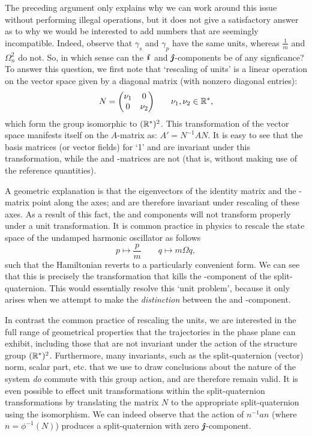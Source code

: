 The preceding argument only explains why we can work around this issue without performing illegal operations, but it does not give a satisfactory answer as to why we would be interested to add numbers that are seemingly incompatible. Indeed, observe that \(\gamma_s\) and \(\gamma_p\) have the same units, whereas \(\tfrac{1}{m}\) and \(\Omega_n^2\) do not. So, in which sense can the \(\quati\) and \(\quatj\)-components be of any signficance? To answer this question, we first note that `rescaling of units' is a linear operation on the vector space given by a diagonal matrix (with nonzero diagonal entries): 
\begin{equation}
     N = \mqty(\dmat[0]{\nu_1}{\nu_2}) \qquad \nu_1, \nu_2 \in \real^*,
\end{equation}
which form the group isomorphic to \((\real^*)^2\). This transformation of the vector space manifests itself on the \(A\)-matrix as: \( A' = N^{-1}A N\). It is easy to see that the basis matrices (or vector fields) for `1' and \quatk are invariant under this transformation, while the \quati and \quatj-matrices are not (that is, without making use of the reference quantities). 

A geometric explanation is that the eigenvectors of the identity matrix and the \quatk-matrix point along the axes; and are therefore invariant under rescaling of these axes. As a result of this fact, the \quati and \quatj components will not transform properly under a unit transformation. It is common practice in physics to rescale the state space of the undamped harmonic oscillator as follows \cite{Dekker1981,Dedene1980}
\begin{equation}
     p \mapsto \frac{p}{m} \qquad q \mapsto m\Omega q,
\end{equation}
such that the Hamiltonian reverts to a particularly convenient form. We can see that this is precisely the transformation that kills the \quatj-component of the split-quaternion. This would essentially resolve this `unit problem', because it only arises when we attempt to make the \emph{distinction} between the \quati and \quatj-component.

In contrast the common practice of rescaling the units, we are interested in the full range of geometrical properties that the trajectories in the phase plane can exhibit, including those that are not invariant under the action of the structure group \((\real^*)^2\). Furthermore, many invariants, such as the split-quaternion (vector) norm, scalar part, etc. that we use to draw conclusions about the nature of the system \emph{do} commute with this group action, and are therefore remain valid. It is even possible to effect unit transformations within the split-quaternion transformations by translating the matrix \(N\) to the appropriate split-quaternion using the isomorphism. We can indeed observe that the action of \(n^{-1} a n\) (where \(n = \phi^{-1}(N)\)) produces a split-quaternion with zero \(\quatj\)-component. 

